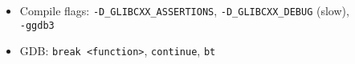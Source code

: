 \begin{itemize}
    \item Compile flags: \texttt{-D\_GLIBCXX\_ASSERTIONS}, \texttt{-D\_GLIBCXX\_DEBUG} (slow), \\\texttt{-ggdb3}
    \item GDB: \texttt{break <function>}, \texttt{continue}, \texttt{bt}
\end{itemize}
